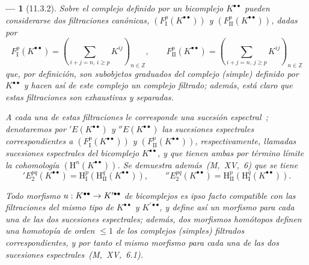 \documentclass[10pt,oneside,openany]{book}
\theoremstyle{egaenv}\newtheorem*{env}{---}
\theoremstyle{egastatement}
\theoremstyle{egadescription}
\newcommand{\oldpage}[2][]{\marginnote{\normalfont\scriptsize\textbf{#1}\,|\,#2}\ignorespaces}
\renewcommand{\leq}{\leqslant}
\renewcommand{\geq}{\geqslant}
\renewcommand{\to}{\mathchoice{\longrightarrow}{\rightarrow}{\rightarrow}{\rightarrow}}
\begin{document}
\begin{env}[11.3.2]
\label{0.11.3.2}
\label{0.11.3.2-fr}
Sobre el complejo definido por un bicomplejo $K^{\bullet\bullet}$ pueden considerarse dos filtraciones canónicas, $(F_{\mathrm I}^p(K^{\bullet\bullet}))$ y $(F_{\mathrm{II}}^p(K^{\bullet\bullet}))$, dadas por
\[
\label{0.11.3.2.1-fr}
  F_{\mathrm I}^p(K^{\bullet\bullet})
  =\left(\sum_{i+j=n,\,i\geq p}K^{ij}\right)_{n\in\mathbb Z},
  \qquad
  F_{\mathrm{II}}^p(K^{\bullet\bullet})
  =\left(\sum_{i+j=n,\,j\geq p}K^{ij}\right)_{n\in\mathbb Z}
  \tag{11.3.2.1}
\]
\oldpage[0\textsubscript{III}]{30}
que, por definición, son subobjetos graduados del complejo (simple) definido por $K^{\bullet\bullet}$ y hacen así de este complejo un complejo filtrado;
además, está claro que estas filtraciones son \emph{exhaustivas} y \emph{separadas}.

A cada una de estas filtraciones le corresponde una sucesión espectral~;
denotaremos por $'E(K^{\bullet\bullet})$ y $''E(K^{\bullet\bullet})$ las sucesiones espectrales correspondientes a $(F_{\mathrm I}^p(K^{\bullet\bullet}))$ y $(F_{\mathrm{II}}^p(K^{\bullet\bullet}))$, respectivamente, llamadas \emph{sucesiones espectrales del bicomplejo $K^{\bullet\bullet}$}, y que tienen ambas por término límite la cohomología $(\mathrm H^n(K^{\bullet\bullet}))$.
Se demuestra además~(M,~XV,~6) que se tiene
\[
\label{0.11.3.2.2-fr}
  'E_2^{pq}(K^{\bullet\bullet})
  =\mathrm H_{\mathrm I}^p(\mathrm H_{\mathrm{II}}^q(K^{\bullet\bullet})),
  \qquad
  ''E_2^{pq}(K^{\bullet\bullet})
  =\mathrm H_{\mathrm{II}}^p(\mathrm H_{\mathrm I}^q(K^{\bullet\bullet})).
  \tag{11.3.2.2}
\]

Todo morfismo $u:K^{\bullet\bullet}\to K^{\prime\bullet\bullet}$ de bicomplejos es \emph{ipso facto} compatible con las filtraciones del mismo tipo de $K^{\bullet\bullet}$ y $K^{\prime\bullet\bullet}$, y define así un morfismo para cada una de las dos sucesiones espectrales;
además, dos morfismos \emph{homótopos} definen una homotopía \emph{de orden $\leq1$} de los complejos (simples) filtrados correspondientes, y por tanto el \emph{mismo} morfismo para cada una de las dos sucesiones espectrales~(M,~XV,~6.1).
\end{env}
\end{document}
